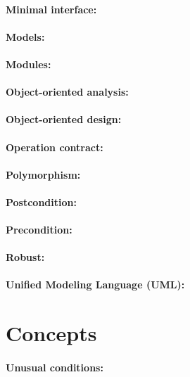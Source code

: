         \paragraph{   Minimal interface: }
        \paragraph{   Models: }
        \paragraph{   Modules: }
        \paragraph{   Object-oriented analysis: }
        \paragraph{   Object-oriented design: }
        \paragraph{   Operation contract: }
        \paragraph{   Polymorphism: }
        \paragraph{   Postcondition: }
        \paragraph{   Precondition: }
        \paragraph{   Robust: }
        \paragraph{   Unified Modeling Language (UML): }

    \section*{Concepts}

        \paragraph{Unusual conditions:}


